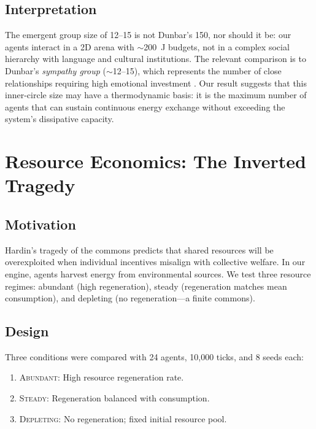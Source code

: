 \documentclass[12pt,a4paper]{article}
\begin{document}
\subsection{Interpretation}

The emergent group size of 12--15 is not Dunbar's 150, nor should it be: our agents interact in a 2D arena with $\sim$200~J budgets, not in a complex social hierarchy with language and cultural institutions. The relevant comparison is to Dunbar's \emph{sympathy group} ($\sim$12--15), which represents the number of close relationships requiring high emotional investment \citep{dunbar2010}. Our result suggests that this inner-circle size may have a thermodynamic basis: it is the maximum number of agents that can sustain continuous energy exchange without exceeding the system's dissipative capacity.

\section{Resource Economics: The Inverted Tragedy}
\label{sec:commons}

\subsection{Motivation}

Hardin's tragedy of the commons \citep{hardin1968} predicts that shared resources will be overexploited when individual incentives misalign with collective welfare. In our engine, agents harvest energy from environmental sources. We test three resource regimes: abundant (high regeneration), steady (regeneration matches mean consumption), and depleting (no regeneration---a finite commons).

\subsection{Design}

Three conditions were compared with 24 agents, 10{,}000 ticks, and 8 seeds each:

\begin{enumerate}
\item \textsc{Abundant}: High resource regeneration rate.
\item \textsc{Steady}: Regeneration balanced with consumption.
\item \textsc{Depleting}: No regeneration; fixed initial resource pool.
\end{enumerate}
\end{document}
